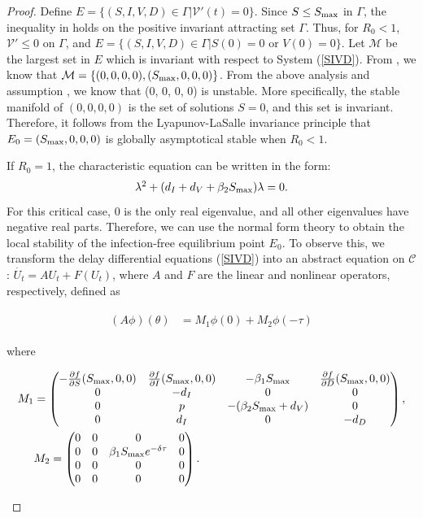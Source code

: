 \documentclass{CMHPhD-SIVD}
\begin{document}
\begin{proof}
Define $E=\{(S, I, V, D)\in \Gamma |\mathcal{V}'(t)=0\}$.	Since $S\leq S_{\text{max}}$ in $\Gamma$, the inequality in  holds on the positive invariant attracting set $\Gamma$. Thus, for $R_0 < 1$, $\mathcal{V}' \le 0$ on $\Gamma$, and
	$E=\{(S, I, V, D)\in \Gamma|S(0)=0 \text{ or } V(0)=0\}$. Let $\mathcal{M}$ be the largest set in $E$ which is invariant with respect to System (\ref{SIVD}). From , we know that $\mathcal{M}=\{(0, 0, 0, 0),(S_{\text{max}}, 0, 0, 0)\}$. 
	From the above analysis and assumption , we know that (0, 0, 0, 0) is unstable. More specifically,  the stable manifold of $(0,0,0,0)$ is the set of solutions $S=0$, and this set is invariant.  Therefore, it follows from the Lyapunov-LaSalle invariance principle\cite{hale1993introduction} that $E_0=(S_{\text{max}}, 0, 0, 0)$ is globally asymptotical stable when $R_0<1$.


If $R_0=1$, the characteristic equation can be written in the form:
\begin{equation}\label{25}
   \begin{array}{ll}
     \lambda^2+(d_I+d_V+\beta_2 S_{\text{max}})\lambda=0.
   \end{array}
\end{equation}
For this critical case, 0 is the only real eigenvalue, and all other eigenvalues have negative real parts. Therefore, we can use the normal form theory \cite{faria2000normal,hassard1981theory} to obtain the local stability of the infection-free equilibrium point $E_0$. To observe this, we transform the delay differential equations (\ref{SIVD}) into an abstract equation on $\mathcal{C}$: $\dot{U_t}=AU_t+F(U_t)$, where $A$ and $F$ are the linear and nonlinear operators, respectively, defined as

\begin{align}\label{26}
\begin{split}
     (A\phi)(\theta)&=M_1 \phi(0)
     +M_2\phi(-\tau)
     \end{split}
\end{align}

where
\begin{small}
\begin{eqnarray*}
M_{1}&=
\begin{pmatrix}
       -\frac{\partial f}{\partial S}(S_{\text{max}}, 0, 0) & \frac{\partial f}{\partial I}(S_{\text{max}}, 0, 0) & -\beta_1 S_{\text{max}} & \frac{\partial f }{\partial D}(S_{\text{max}}, 0, 0) \\
       0 & -d_I & 0 & 0 \\
       0 & p & -(\beta_2 S_{\text{max}}+d_V) & 0 \\
       0 & d_I & 0 & -d_D
     \end{pmatrix},\nonumber \\
&
M_{2}=
\begin{pmatrix}
     0 & 0 & 0 & 0  \\
        0 & 0 & \beta_1 S_{\text{max}} e^{-\delta \tau} & 0 \\
        0 & 0 & 0 & 0  \\
        0 & 0 & 0 & 0
     \end{pmatrix}.
\end{eqnarray*}
\end{small}


\end{proof}
\end{document}
